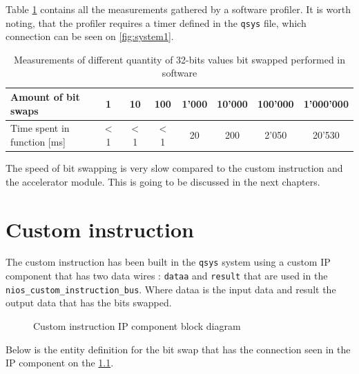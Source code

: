 Table \ref{table:softwareCodeMeasure} contains all the measurements gathered by a software profiler. It is worth noting, that the profiler requires a timer defined in the \verb|qsys| file, which connection can be seen on \figurename{} \ref{fig:system1}.

\begin{table}[h!]
\centering
\begin{tabular}{    |l|c|c|c|c|c|c|c|  }
\hline
 Amount of bit swaps & 1 & 10 & 100 & 1'000 & 10'000 & 100'000 & 1'000'000\\
 \hline
 Time spent in function [ms]  & $<$ 1  & $<$ 1  & $<$ 1 & 20 & 200 & 2'050 & 20'530\\
 \hline
\end{tabular}
 \caption{Measurements of different quantity of 32-bits values bit swapped performed in software}
\label{table:softwareCodeMeasure}
\end{table}
The speed of bit swapping is very slow compared to the custom instruction and the accelerator module. This is going to be discussed in the next chapters.

\begingroup
\renewcommand{\cleardoublepage}{}
\renewcommand{\clearpage}{}
\chapter{Custom instruction}
\endgroup

The custom instruction has been built in the \verb|qsys| system using a custom IP component that has two data wires : \verb|dataa| and \verb|result| that are used in the \verb|nios_custom_instruction_bus|. Where dataa is the input data and result the output data that has the bits swapped.

\begin{figure}[H]
	\begin{center}
	\end{center}
	\caption{Custom instruction IP component block diagram}
	\label{fig:customInstruction_blockDiagram}
\end{figure}

 Below is the entity definition for the bit swap that has the connection seen in the IP component on the \figurename{} \ref{fig:customInstruction_blockDiagram}.

